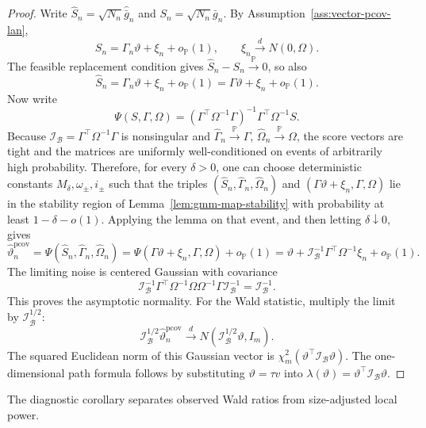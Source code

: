 \documentclass[11pt,a4paper]{amsart}
\theoremstyle{plain}
\theoremstyle{definition}
\theoremstyle{remark}
\newcommand{\PP}{\mathbb{P}}
\newcommand{\toP}{\xrightarrow{\PP}}
\newcommand{\toD}{\xrightarrow{d}}
\newcommand{\scrB}{\mathcal{B}}
\newcommand{\scrI}{\mathcal{I}}
\begin{document}
\begin{proof}
Write \(\widehat S_n=\sqrt{N_n}\widehat{\bar g}_n\) and \(S_n=\sqrt{N_n}\bar g_n\).  By
Assumption~\ref{ass:vector-pcov-lan},
\[
        S_n=\Gamma_n\vartheta+\xi_n+o_{\PP}(1),
        \qquad
        \xi_n\toD N(0,\Omega).
\]
The feasible replacement condition gives \(\widehat S_n-S_n\toP 0\), so also
\[
        \widehat S_n=\Gamma_n\vartheta+\xi_n+o_{\PP}(1)
        =
        \Gamma\vartheta+\xi_n+o_{\PP}(1).
\]
Now write
\[
        \Psi(S,\Gamma,\Omega)
        =
        (\Gamma^\top\Omega^{-1}\Gamma)^{-1}\Gamma^\top\Omega^{-1}S.
\]
Because \(\scrI_{\scrB}=\Gamma^\top\Omega^{-1}\Gamma\) is nonsingular and
\(\widehat\Gamma_n\toP\Gamma\), \(\widehat\Omega_n\toP\Omega\), the score vectors are tight and the
matrices are uniformly well-conditioned on events of arbitrarily high probability.  Therefore, for
every \(\delta>0\), one can choose deterministic constants \(M_\delta,\omega_\pm,i_\pm\) such that
the triples
\((\widehat S_n,\widehat\Gamma_n,\widehat\Omega_n)\) and \((\Gamma\vartheta+\xi_n,\Gamma,\Omega)\)
lie in the stability region of Lemma~\ref{lem:gmm-map-stability} with probability at least
\(1-\delta-o(1)\).  Applying the lemma on that event, and then letting \(\delta\downarrow0\), gives
\[
        \widehat\vartheta_n^{\mathrm{pcov}}
        =
        \Psi(\widehat S_n,\widehat\Gamma_n,\widehat\Omega_n)
        =
        \Psi(\Gamma\vartheta+\xi_n,\Gamma,\Omega)+o_{\PP}(1)
        =
        \vartheta+
        \scrI_{\scrB}^{-1}\Gamma^\top\Omega^{-1}\xi_n+o_{\PP}(1).
\]
The limiting noise is centered Gaussian with covariance
\[
        \scrI_{\scrB}^{-1}\Gamma^\top\Omega^{-1}
        \Omega
        \Omega^{-1}\Gamma\scrI_{\scrB}^{-1}
        =
        \scrI_{\scrB}^{-1}.
\]
This proves the asymptotic normality.  For the Wald statistic, multiply the limit by
\(\scrI_{\scrB}^{1/2}\):
\[
        \scrI_{\scrB}^{1/2}\widehat\vartheta_n^{\mathrm{pcov}}
        \toD
        N(\scrI_{\scrB}^{1/2}\vartheta,I_m).
\]
The squared Euclidean norm of this Gaussian vector is
\(\chi_m^2(\vartheta^\top\scrI_{\scrB}\vartheta)\).  The one-dimensional path formula follows by substituting
\(\vartheta=\tau v\) into \(\lambda(\vartheta)=\vartheta^\top\scrI_{\scrB}\vartheta\).
\end{proof}

The diagnostic corollary separates observed Wald ratios from size-adjusted local power.
\end{document}
